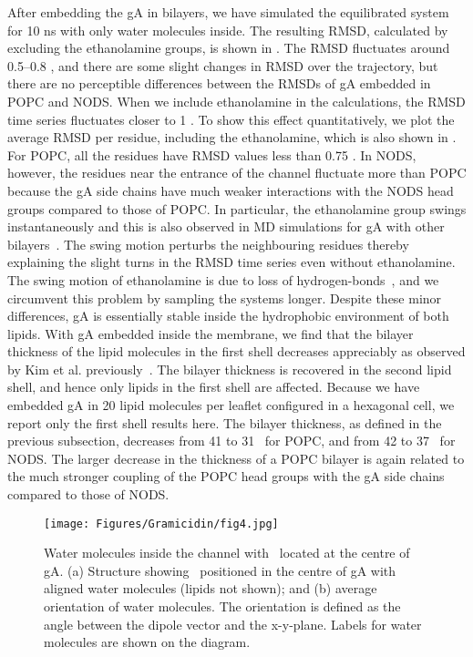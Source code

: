 After embedding the gA in bilayers, we have simulated the equilibrated system for 10 ns with only 
water molecules inside. The resulting RMSD, calculated by excluding the ethanolamine groups, is 
shown in . The RMSD fluctuates around 0.5--0.8 \angs, and there are some 
slight changes in RMSD over the trajectory, but there are no perceptible differences between the 
RMSDs of gA embedded in POPC and NODS. When we include ethanolamine in the calculations, the RMSD 
time series fluctuates closer to 1 \angs. To show this effect quantitatively, we plot the average 
RMSD per residue, including the ethanolamine, which is also shown in . For POPC, 
all the residues have RMSD values less than 0.75 \angs. In NODS, however, the residues near the 
entrance of the channel fluctuate more than POPC because the gA side chains have much weaker 
interactions with the NODS head groups compared to those of POPC. In particular, the ethanolamine 
group swings instantaneously and this is also observed in MD simulations for gA with other 
bilayers~\cite{Kim2012}. The swing motion perturbs the neighbouring residues thereby explaining the 
slight turns in the RMSD time series even without ethanolamine. The swing motion of ethanolamine is 
due to loss of hydrogen-bonds~\cite{Ingolfsson2011}, and we circumvent this problem by sampling the 
systems longer. Despite these minor differences, gA is essentially stable inside the hydrophobic 
environment of both lipids. With gA embedded inside the membrane, we find that the bilayer thickness 
of the lipid molecules in the first shell decreases appreciably as observed by Kim et al. 
previously~\cite{Kim2012}. The bilayer thickness is recovered in the second lipid shell, and hence 
only lipids in the first shell are affected. Because we have embedded gA in 20 lipid molecules per 
leaflet configured in a hexagonal cell, we report only the first shell results here. The bilayer 
thickness, as defined in the previous subsection, decreases from 41 to 31 \angs\ for POPC, and from 
42 to 37 \angs\ for NODS. The larger decrease in the thickness of a POPC bilayer is again related to 
the much stronger coupling of the POPC head groups with the gA side chains compared to those of NODS.

\begin{figure}[t!]
 \centering
 \texttt{[image: Figures/Gramicidin/fig4.jpg]}
  \caption{Water molecules inside the channel with \K\ located at the centre of gA. (a) Structure 
           showing \K\ positioned in the centre of gA with aligned water molecules (lipids not shown); 
           and (b) average orientation of water molecules. The orientation is defined as the angle 
           between the dipole vector and the x-y-plane. Labels for water molecules are shown on the 
           diagram.}
\label{gA:fig4}
\end{figure}  

